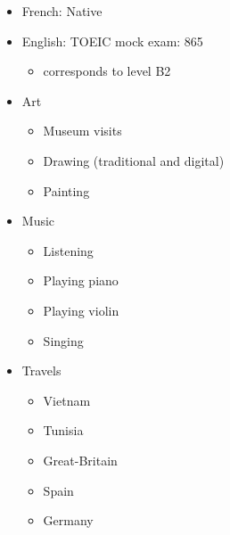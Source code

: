 \documentclass[a4paper,table]{twentysecondcv}
\begin{document}
{  \begin{itemize}[leftmargin=1mm]
    \setlength\itemsep{-5pt}
    \item French: Native
    \item English: TOEIC mock exam: 865
      \vspace{-5pt}
    \begin{itemize}
      \setlength\itemsep{-5pt}
      \item corresponds to level B2
    \end{itemize}
  \end{itemize}
  \begin{flushleft}
  \begin{itemize}[leftmargin=1mm]
    \setlength\itemsep{-5pt}
    \item Art
    \vspace{-5pt}
    \begin{itemize}
      \item Museum visits
      \item Drawing (traditional and digital)
      \item Painting
    \end{itemize}
    \item Music
    \vspace{-5pt}
    \begin{itemize}
      \setlength\itemsep{-5pt}
      \item Listening
      \item Playing piano
      \item Playing violin
      \item Singing
    \end{itemize}
    \item Travels
    \vspace{-5pt}
    \begin{itemize}
      \setlength\itemsep{-5pt}
      \item Vietnam
      \item Tunisia
      \item Great-Britain
      \item Spain
      \item Germany
    \end{itemize}
  \end{itemize}
  \end{flushleft}
}

\makeprofile{}

\vspace{-0.1cm}
\begin{center}
\end{center}
\vspace{-0.1cm}
\end{document}
